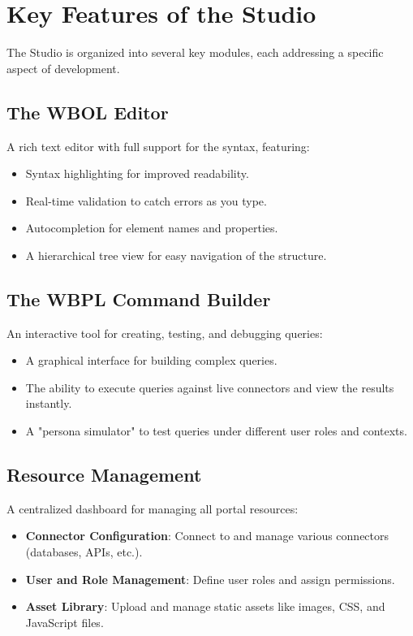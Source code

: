 \section{Key Features of the Studio}
\label{sec:studio-features}

The Studio is organized into several key modules, each addressing a specific aspect of \webbase{} development.

\subsection{The WBOL Editor}
A rich text editor with full support for the \wbol{} syntax, featuring:
\begin{itemize}
    \item Syntax highlighting for improved readability.
    \item Real-time validation to catch errors as you type.
    \item Autocompletion for element names and properties.
    \item A hierarchical tree view for easy navigation of the \webbase{} structure.
\end{itemize}

\subsection{The WBPL Command Builder}
An interactive tool for creating, testing, and debugging \wbpl{} queries:
\begin{itemize}
    \item A graphical interface for building complex queries.
    \item The ability to execute queries against live connectors and view the results instantly.
    \item A "persona simulator" to test queries under different user roles and contexts.
\end{itemize}

\subsection{Resource Management}
A centralized dashboard for managing all portal resources:
\begin{itemize}
    \item \textbf{Connector Configuration}: Connect to and manage various connectors (databases, APIs, etc.).
    \item \textbf{User and Role Management}: Define user roles and assign permissions.
    \item \textbf{Asset Library}: Upload and manage static assets like images, CSS, and JavaScript files.
\end{itemize}

